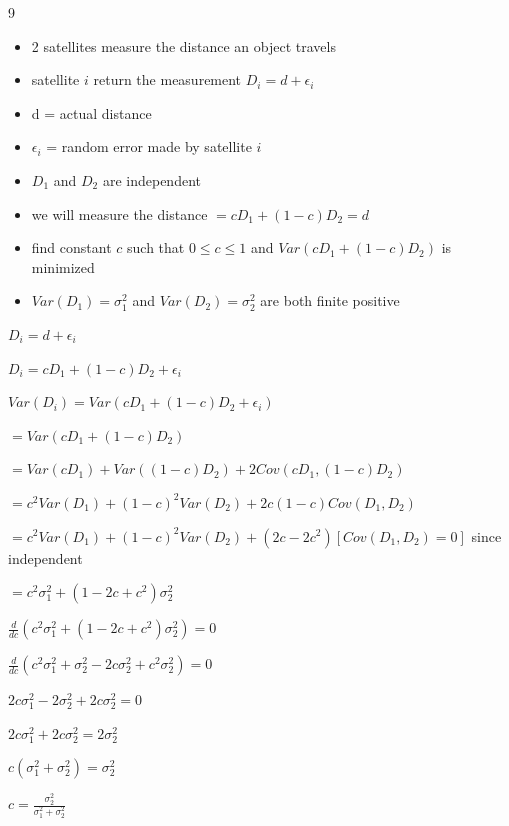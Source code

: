 \documentclass[12 pt]{article}
\begin{document}
    \begin{exercise}{9}
    \hfill

    \begin{itemize}
        \item 2 satellites measure the distance an object travels
        \item satellite $i$ return the measurement $D_i = d + \epsilon_i$
        \item d = actual distance
        \item $\epsilon_i$ = random error made by satellite $i$
        \item $D_1$ and $D_2$ are independent
        \item we will measure the distance $= c D_1 + (1-c)D_2 = d$
        \item find constant $c$ such that $0 \leq c \leq 1$ and $Var(cD_1 + (1-c)D_2)$ is minimized
        \item $Var(D_1) = \sigma_1^2$ and $Var(D_2) = \sigma_2^2$ are both finite positive
    \end{itemize}

    \hfill

    $D_i = d + \epsilon_i$

    $D_i = cD_1 + (1-c)D_2 + \epsilon_i$

    $Var(D_i) = Var(cD_1 + (1-c)D_2 + \epsilon_i)$

    $= Var(cD_1 + (1-c)D_2)$

    $= Var(cD_1) + Var((1-c)D_2) + 2Cov(cD_1, (1-c)D_2)$

    $= c^2 Var(D_1) + (1-c)^2 Var(D_2) + 2c(1-c)Cov(D_1, D_2)$

    $= c^2 Var(D_1) + (1-c)^2 Var(D_2) + (2c-2c^2) [Cov(D_1, D_2) = 0]$ since independent 

    $= c^2 \sigma_1^2 + (1-2c+c^2) \sigma_2^2$

    \hfill

    $\frac{d}{dc}(c^2 \sigma_1^2 + (1-2c+c^2) \sigma_2^2) = 0$

    $\frac{d}{dc}(c^2 \sigma_1^2 + \sigma_2^2 - 2c \sigma_2^2 + c^2 \sigma_2^2) = 0$

    $2c \sigma_1^2 - 2 \sigma_2^2 + 2c \sigma_2^2 = 0$

    $2c \sigma_1^2 + 2c \sigma_2^2 = 2 \sigma_2^2$

    $c(\sigma_1^2 + \sigma_2^2) = \sigma_2^2$

    $c = \frac{\sigma_2^2}{\sigma_1^2 + \sigma_2^2}$

    \hfill


\end{exercise}
\end{document}
